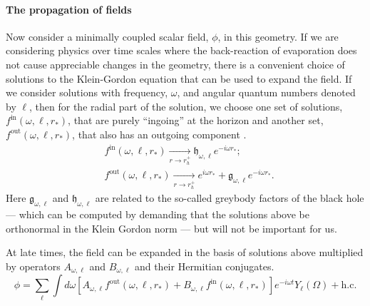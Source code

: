 \documentclass[12pt]{article}
\def\fout{f^{\text{out}}}
\def\fin{f^{\text{in}}}
\def\grey{\mathfrak{g}}
\def\white{\mathfrak{h}}
\def\rtor{{r_*}}
\newcommand{\be}{\begin{equation}}
\newcommand{\ee}{\end{equation}}
\begin{document}
\paragraph{\bf The propagation of fields \\}
Now consider a minimally coupled scalar field, $\phi$,  in this geometry.  If we are considering physics over time scales where the back-reaction of evaporation does not cause appreciable changes in the geometry,  there is a convenient choice of solutions to the Klein-Gordon equation that can be used to expand the field. If we consider solutions with frequency, $\omega$, and angular quantum numbers denoted by $\ell$, then for the radial part of the solution, we choose one set of solutions, $\fin(\omega, \ell, \rtor)$, that are purely ``ingoing'' at the horizon and another set, $\fout(\omega, \ell, \rtor)$, that also has an outgoing component \cite{Candelas:1980zt,dewitt1975quantum}.
\be
\label{foutfinexpansion}
\begin{split}
&\fin(\omega, \ell, \rtor) \underset{r \rightarrow r_h^+}{\longrightarrow} \white_{\omega, \ell} e^{-i \omega \rtor};\\ 
&\fout(\omega, \ell, \rtor)  \underset{r \rightarrow r_h^+}{\longrightarrow} e^{i \omega \rtor} + \grey_{\omega, \ell} e^{-i \omega \rtor}.
\end{split}
\ee
Here $\grey_{\omega, \ell}$ and $\white_{\omega, \ell}$ are related to the so-called greybody factors of the black hole --- which can be computed by demanding that the solutions above be orthonormal in the Klein Gordon norm --- but will not be important for us.

At late times, the field can be expanded in the basis of solutions above  multiplied by operators $A_{\omega, \ell}$ and $B_{\omega, \ell}$ and their Hermitian conjugates.
\be
\label{fieldoutside}
\phi = \sum_{\ell} \int d \omega \left[A_{\omega, \ell} \fout(\omega, \ell, \rtor)  + B_{\omega, \ell} \fin(\omega, \ell, \rtor)\right] e^{-i \omega t} Y_{\ell}(\Omega) + \text{h.c.}
\ee
\end{document}
